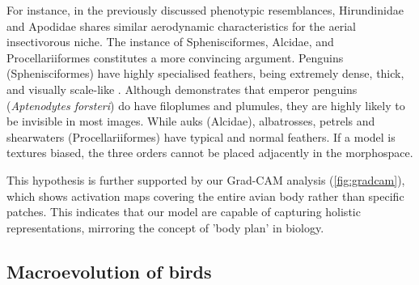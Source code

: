 For instance, in the previously discussed phenotypic resemblances, Hirundinidae and Apodidae
shares similar aerodynamic characteristics for the aerial insectivorous niche.
The instance of Sphenisciformes, Alcidae, and Procellariiformes constitutes a more convincing argument.
Penguins (Sphenisciformes) have highly specialised feathers, being extremely dense,
thick, and visually scale-like \parencite{Williams2015Hidden}.
Although \textcite{Williams2015Hidden} demonstrates that
emperor penguins (\textit{Aptenodytes forsteri}) do have filoplumes and plumules,
they are highly likely to be invisible in most images.
While auks (Alcidae), albatrosses, petrels and shearwaters (Procellariiformes) have typical and normal feathers.
If a model is textures biased, the three orders cannot be placed adjacently in the morphospace.

This hypothesis is further supported by our Grad-CAM analysis (\cref{fig:gradcam}),
which shows activation maps covering the entire avian body rather than specific patches.
This indicates that our model are capable of capturing holistic representations,
mirroring the concept of 'body plan' in biology.



\subsection{Macroevolution of birds}\label{subsec:macroevolution-of-birds}

